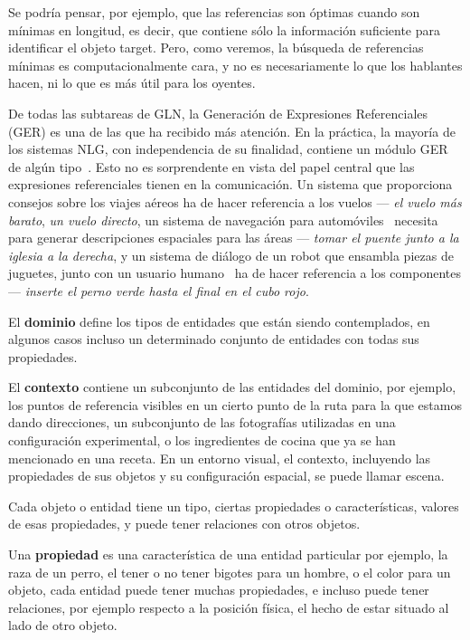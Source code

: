 Se podr\'{i}a pensar, por ejemplo, que las referencias son \'optimas cuando son m\'{i}nimas en longitud, es decir, 
que contiene s\'olo la informaci\'on suficiente para identificar el objeto target. Pero, como veremos, la b\'usqueda de referencias m\'{i}nimas
es computacionalmente cara, y no es necesariamente lo que los hablantes hacen, ni lo que es m\'as \'util para los oyentes.

De todas las subtareas de GLN, la Generaci\'on de Expresiones Referenciales (GER) es
una de las que ha recibido m\'as atenci\'on. En la pr\'actica, la mayor\'ia de los
sistemas NLG, con independencia de su finalidad, contiene un m\'odulo GER de alg\'un tipo~\cite{Mellish2004}. Esto no es sorprendente
en vista del papel central que las expresiones referenciales tienen en la comunicaci\'on. Un sistema que proporciona
consejos sobre los viajes a\'ereos \cite{white2010generating} ha de hacer referencia a los vuelos --- {\it el
vuelo m\'as barato}, {\it un vuelo directo}, un sistema de navegaci\'on para autom\'oviles~\cite{Drager:2012:GLN:2380816.2380908}
necesita para generar descripciones espaciales para las \'areas --- {\it tomar el puente junto a la iglesia a la derecha},
y un sistema de di\'alogo de un robot que ensambla piezas de juguetes, junto con un usuario humano~\cite{foster-etal-ijcai2009} ha de hacer referencia a los componentes --- {\it inserte el perno verde hasta el final en el cubo rojo}.

El {\bf dominio} define los tipos de entidades que est\'an siendo contemplados, en algunos
casos incluso un determinado conjunto de entidades con todas sus propiedades.

El {\bf contexto} contiene un subconjunto de las entidades del dominio, por ejemplo, los puntos de referencia visibles en un cierto punto de la ruta para la que estamos dando direcciones, un subconjunto de las fotograf\'ias utilizadas en una configuraci\'on experimental, o los ingredientes de cocina que ya se han mencionado en una receta. En un entorno visual, el contexto, incluyendo las
propiedades de sus objetos y su configuraci\'on espacial, se puede llamar escena. 

Cada objeto o entidad tiene un tipo, ciertas propiedades o caracter\'isticas, valores de esas propiedades, y puede tener relaciones con otros objetos.

Una {\bf propiedad} es una caracter\'istica de una entidad particular por ejemplo, la raza de un perro, el tener o no tener bigotes para un hombre, o el color para un objeto, cada entidad puede tener muchas propiedades, e incluso puede tener relaciones, por ejemplo respecto a la posici\'on f\'isica, el hecho de estar situado al lado de otro objeto.

